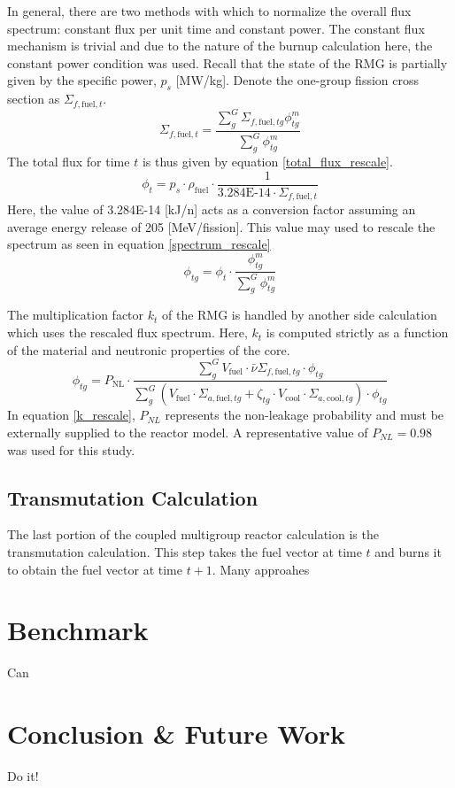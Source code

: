 In general, there are two methods with which to normalize the overall flux spectrum: constant flux
per unit time and constant power.  The constant flux mechanism is trivial and due to the nature of 
the burnup calculation here, the constant power condition was used.  Recall that the state of the 
RMG is partially given by the specific power, $p_s$ [MW/kg].  Denote the one-group fission cross
section as $\Sigma_{f,\mbox{fuel},t}$.
\begin{equation}
\label{one_group_fission}
\Sigma_{f,\mbox{fuel},t} = \frac{\sum_g^G \Sigma_{f,\mbox{fuel},tg}\phi_{tg}^m}
                                {\sum_g^G \phi_{tg}^m}
\end{equation}
The total flux for time $t$ is thus given by equation \ref{total_flux_rescale}.
\begin{equation}
\label{total_flux_rescale}
\phi_t = p_s \cdot  \rho_{\mbox{fuel}} \cdot \frac{1}
                                                  {\mbox{3.284E-14} \cdot \Sigma_{f,\mbox{fuel},t}}
\end{equation}
Here, the value of 3.284E-14 [kJ/n] acts as a conversion factor assuming an average 
energy release of 205 [MeV/fission].  This value may used to rescale the spectrum 
as seen in equation \ref{spectrum_rescale}
\begin{equation}
\label{spectrum_rescale}
\phi_{tg} = \phi_t \cdot  \frac{\phi_{tg}^m}
                               {\sum_g^G \phi_{tg}^m}
\end{equation}

The multiplication factor $k_t$ of the RMG is handled by another side calculation which 
uses the rescaled flux spectrum.  Here, $k_t$ is computed strictly as a function of the 
material and neutronic properties of the core.
\begin{equation}
\label{k_rescale}
\phi_{tg} = P_{\mbox{NL}} \cdot \frac{\sum_g^G V_{\mbox{fuel}} \cdot \bar{\nu}\Sigma_{f,\mbox{fuel},tg} \cdot \phi_{tg}}
                                {\sum_g^G \left(V_{\mbox{fuel}} \cdot \Sigma_{a,\mbox{fuel},tg} + \zeta_{tg} \cdot V_{\mbox{cool}} \cdot \Sigma_{a,\mbox{cool},tg}\right) \cdot  \phi_{tg}}
\end{equation}
In equation \ref{k_rescale}, $P_{NL}$ represents the non-leakage probability and must be externally supplied
to the reactor model.  A representative value of $P_{NL} = 0.98$ was used for this study.


\subsection{Transmutation Calculation}
\label{mg_sec:trans_calc}
The last portion of the coupled multigroup reactor calculation is the transmutation calculation.
This step takes the fuel vector at time $t$ and burns it to obtain the fuel vector at time $t+1$.
Many approahes


\section{Benchmark}
Can

\section{Conclusion \& Future Work}
Do it!

